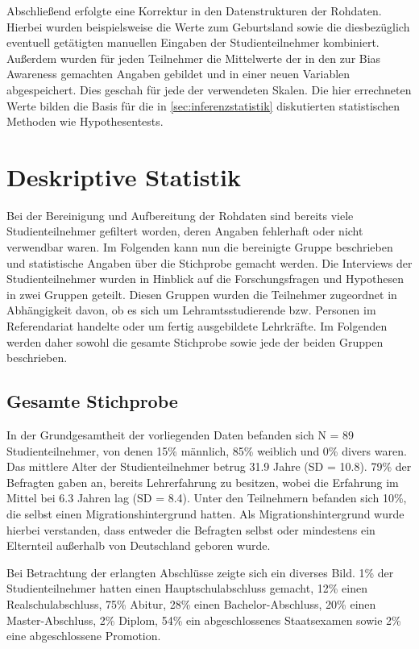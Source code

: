 Abschließend erfolgte eine Korrektur in den Datenstrukturen der Rohdaten.
Hierbei wurden beispielsweise die Werte zum Geburtsland sowie die diesbezüglich eventuell getätigten manuellen Eingaben der Studienteilnehmer kombiniert.
Außerdem wurden für jeden Teilnehmer die Mittelwerte der in den zur Bias Awareness gemachten Angaben gebildet und in einer neuen Variablen abgespeichert.
Dies geschah für jede der verwendeten Skalen.
Die hier errechneten Werte bilden die Basis für die in \autoref{sec:inferenzstatistik} diskutierten statistischen Methoden wie Hypothesentests.


\section{Deskriptive Statistik}
\label{sec:deskriptive-statistik}

Bei der Bereinigung und Aufbereitung der Rohdaten sind bereits viele Studienteilnehmer gefiltert worden, deren Angaben fehlerhaft oder nicht verwendbar waren.
Im Folgenden kann nun die bereinigte Gruppe beschrieben und statistische Angaben über die Stichprobe gemacht werden.
Die Interviews der Studienteilnehmer wurden in Hinblick auf die Forschungsfragen und Hypothesen in zwei Gruppen geteilt.
Diesen Gruppen wurden die Teilnehmer zugeordnet in Abhängigkeit davon, ob es sich um Lehramtsstudierende bzw. Personen im Referendariat handelte oder um fertig ausgebildete Lehrkräfte.
Im Folgenden werden daher sowohl die gesamte Stichprobe sowie jede der beiden Gruppen beschrieben.

\subsection{Gesamte Stichprobe}
\label{subsec:gesamte-stichprobe}

In der Grundgesamtheit der vorliegenden Daten befanden sich N = 89 Studienteilnehmer, von denen 15\% männlich, 85\% weiblich und 0\% divers waren.
Das mittlere Alter der Studienteilnehmer betrug 31.9 Jahre (SD = 10.8).
79\% der Befragten gaben an, bereits Lehrerfahrung zu besitzen, wobei die Erfahrung im Mittel bei 6.3 Jahren lag (SD = 8.4).
Unter den Teilnehmern befanden sich 10\%, die selbst einen Migrationshintergrund hatten.
Als Migrationshintergrund wurde hierbei verstanden, dass entweder die Befragten selbst oder mindestens ein Elternteil außerhalb von Deutschland geboren wurde.

Bei Betrachtung der erlangten Abschlüsse zeigte sich ein diverses Bild.
1\% der Studienteilnehmer hatten einen Hauptschulabschluss gemacht, 12\% einen Realschulabschluss, 75\% Abitur, 28\% einen Bachelor-Abschluss, 20\% einen Master-Abschluss, 2\% Diplom, 54\% ein abgeschlossenes Staatsexamen sowie 2\% eine abgeschlossene Promotion.


